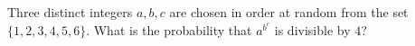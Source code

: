 Three distinct integers $a,b,c$ are chosen in order at random from the set $\{1,2,3,4,5,6\}$. What is the probability that $a^{b^c}$ is divisible by $4$?
